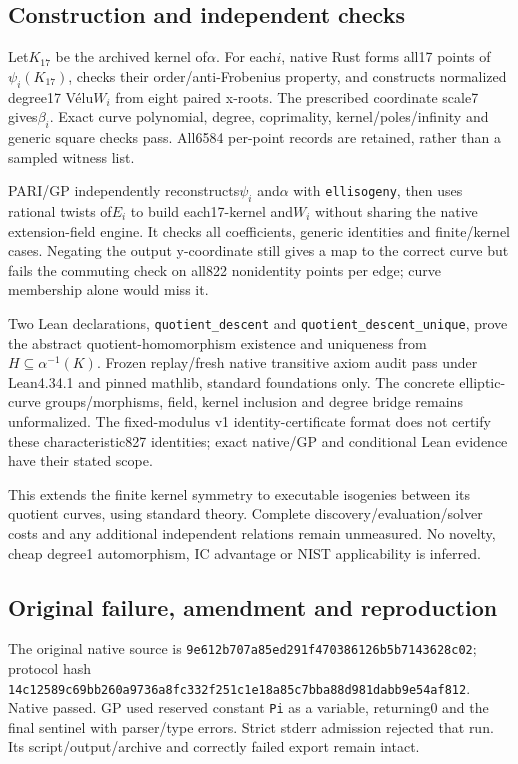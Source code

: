 \documentclass[
  10pt,
]{article}
\begin{document}
\subsection{Construction and independent
checks}\label{construction-and-independent-checks}

Let\(K_{17}\) be the archived kernel of\(\alpha\). For each\(i\), native
Rust forms all17 points of\(\psi_i(K_{17})\), checks their
order/anti-Frobenius property, and constructs normalized degree17
Vélu\(W_i\) from eight paired x-roots. The prescribed coordinate scale7
gives\(\beta_i\). Exact curve polynomial, degree, coprimality,
kernel/poles/infinity and generic square checks pass. All6584 per-point
records are retained, rather than a sampled witness list.

PARI/GP independently reconstructs\(\psi_i\) and\(\alpha\) with
\texttt{ellisogeny}, then uses rational twists of\(E_i\) to build
each17-kernel and\(W_i\) without sharing the native extension-field
engine. It checks all coefficients, generic identities and finite/kernel
cases. Negating the output y-coordinate still gives a map to the correct
curve but fails the commuting check on all822 nonidentity points per
edge; curve membership alone would miss it.

Two Lean declarations, \texttt{quotient\_descent} and
\texttt{quotient\_descent\_unique}, prove the abstract
quotient-homomorphism existence and uniqueness from
\(H\subseteq\alpha^{-1}(K)\). Frozen replay/fresh native transitive
axiom audit pass under Lean4.34.1 and pinned mathlib, standard
foundations only. The concrete elliptic-curve groups/morphisms, field,
kernel inclusion and degree bridge remains unformalized. The
fixed-modulus v1 identity-certificate format does not certify these
characteristic827 identities; exact native/GP and conditional Lean
evidence have their stated scope.

This extends the finite kernel symmetry to executable isogenies between
its quotient curves, using standard theory. Complete
discovery/evaluation/solver costs and any additional independent
relations remain unmeasured. No novelty, cheap degree1 automorphism, IC
advantage or NIST applicability is inferred.

\subsection{Original failure, amendment and
reproduction}\label{original-failure-amendment-and-reproduction}

The original native source is
\texttt{9e612b70\allowbreak{}7a85ed29\allowbreak{}1f470386\allowbreak{}126b5b71\allowbreak{}43628c02}; protocol hash
\texttt{14c12589\allowbreak{}c69bb260\allowbreak{}a9736a8f\allowbreak{}c332f251\allowbreak{}c1e18a85\allowbreak{}c7bba88d\allowbreak{}981dabb9\allowbreak{}e54af812}.
Native passed. GP used reserved constant \texttt{Pi} as a variable,
returning0 and the final sentinel with parser/type errors. Strict stderr
admission rejected that run. Its script/output/archive and correctly
failed export remain intact.
\end{document}
